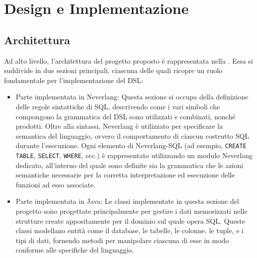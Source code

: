\documentclass[12pt,a4paper,openright,twoside]{book}
\begin{document}
\chapter{Design e Implementazione}
\label{chap:design}

\section{Architettura}
Ad alto livello, l’architettura del progetto proposto è rappresentata nella . Essa si suddivide in due sezioni 
principali, ciascuna delle quali ricopre un ruolo fondamentale per l’implementazione del \ac{DSL}:

\begin{itemize}
\item Parte implementata in Neverlang: Questa sezione si occupa della definizione delle regole sintattiche di \ac{SQL}, descrivendo come 
i vari simboli che compongono la grammatica del \ac{DSL} sono utilizzati e combinati, nonché prodotti. Oltre alla sintassi, Neverlang è 
utilizzato per specificare la semantica del linguaggio, ovvero il comportamento di ciascun costrutto \ac{SQL} durante l’esecuzione. Ogni 
elemento di Neverlang-SQL (ad esempio, \texttt{CREATE TABLE}, \texttt{SELECT}, \texttt{WHERE}, ecc.) è rappresentato utilizzando un modulo Neverlang dedicato, 
all’interno del quale sono definite sia la grammatica che le azioni semantiche necessarie per la corretta interpretazione ed esecuzione 
delle funzioni ad esso associate.
\item Parte implementata in Java: Le classi implementate in questa sezione del progetto sono progettate principalmente per gestire i 
dati memorizzati nelle strutture create appositamente per il dominio sul quale opera \ac{SQL}. Queste classi modellano entità come il 
database, le tabelle, le colonne, le tuple, e i tipi di dati, fornendo metodi per manipolare ciascuna di esse in modo conforme alle 
specifiche del linguaggio.
\end{itemize}
\end{document}
